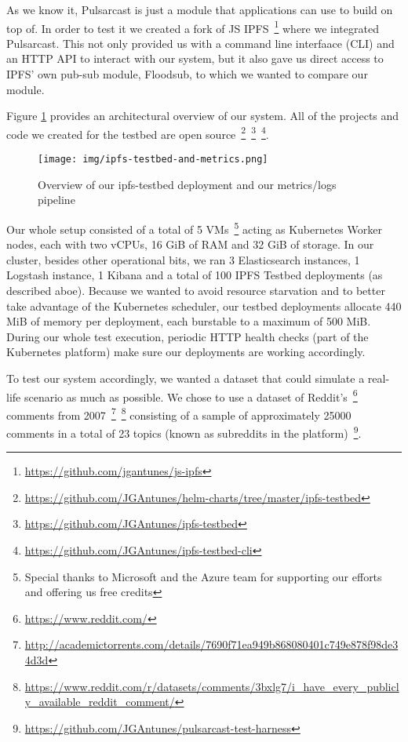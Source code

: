 As we know it, Pulsarcast is just a module that applications can use to build
on top of. In order to test it we created a fork of JS
IPFS~\footnote{\url{https://github.com/jgantunes/js-ipfs}} where we integrated
Pulsarcast. This not only provided us with a command line interfaace (CLI) and
an HTTP API to interact with our system, but it also gave us direct access to
IPFS' own pub-sub module, Floodsub, to which we wanted to compare our module.

Figure \ref{fig:ipfs-testbed-and-metrics} provides an architectural overview of
our system. All of the projects and code we created for the testbed are
open
source~\footnote{\url{https://github.com/JGAntunes/helm-charts/tree/master/ipfs-testbed}}~\footnote{\url{https://github.com/JGAntunes/ipfs-testbed}}~\footnote{\url{https://github.com/JGAntunes/ipfs-testbed-cli}}.

\begin{figure}[!htb]
  \centering
  \texttt{[image: img/ipfs-testbed-and-metrics.png]}
  \caption{Overview of our ipfs-testbed deployment and our metrics/logs
  pipeline}
  \label{fig:ipfs-testbed-and-metrics}
\end{figure}

Our whole setup consisted of a total of 5 VMs~\footnote{Special thanks to
Microsoft and the Azure team for supporting our efforts and offering us free
credits} acting as Kubernetes Worker nodes, each with two vCPUs, 16 GiB of RAM
and 32 GiB of storage. In our cluster, besides other operational bits, we ran 3
Elasticsearch instances, 1 Logstash instance, 1 Kibana and a total of 100 IPFS
Testbed deployments (as described aboe). Because we wanted to avoid resource
starvation and to better take advantage of the Kubernetes scheduler, our
testbed deployments allocate 440 MiB of memory per deployment, each burstable
to a maximum of 500 MiB. During our whole test execution, periodic HTTP health
checks (part of the Kubernetes platform) make sure our deployments are working
accordingly.

To test our system accordingly, we wanted a dataset that could simulate a
real-life scenario as much as possible. We chose to use a dataset of
Reddit's~\footnote{\url{https://www.reddit.com/}} comments from
2007~\footnote{\url{http://academictorrents.com/details/7690f71ea949b868080401c749e878f98de34d3d}}~\footnote{\url{https://www.reddit.com/r/datasets/comments/3bxlg7/i_have_every_publicly_available_reddit_comment/}}
consisting of a sample of approximately 25000 comments in a total of 23 topics
(known as subreddits in the platform)~\footnote{\url{https://github.com/JGAntunes/pulsarcast-test-harness}}.

